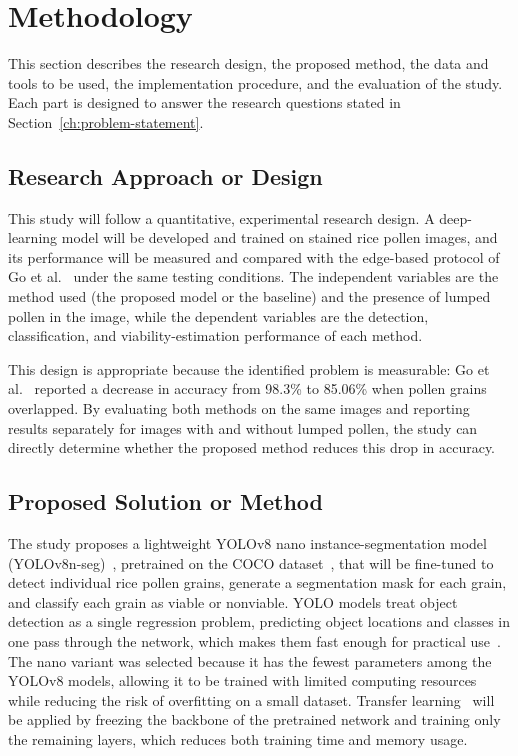 \newpage
\section{Methodology}
\label{ch:methodology}

This section describes the research design, the proposed method, the data and tools to be used, the implementation procedure, and the evaluation of the study. Each part is designed to answer the research questions stated in Section~\ref{ch:problem-statement}.

\subsection{Research Approach or Design}
\label{sec:m-design}

This study will follow a quantitative, experimental research design. A deep-learning model will be developed and trained on stained rice pollen images, and its performance will be measured and compared with the edge-based protocol of Go et al.~\cite{go2019} under the same testing conditions. The independent variables are the method used (the proposed model or the baseline) and the presence of lumped pollen in the image, while the dependent variables are the detection, classification, and viability-estimation performance of each method.

This design is appropriate because the identified problem is measurable: Go et al.~\cite{go2019} reported a decrease in accuracy from 98.3\% to 85.06\% when pollen grains overlapped. By evaluating both methods on the same images and reporting results separately for images with and without lumped pollen, the study can directly determine whether the proposed method reduces this drop in accuracy.

\subsection{Proposed Solution or Method}
\label{sec:m-proposed-method}

The study proposes a lightweight YOLOv8 nano instance-segmentation model (YOLOv8n-seg)~\cite{jocher2023yolov8}, pretrained on the COCO dataset~\cite{lin2014coco}, that will be fine-tuned to detect individual rice pollen grains, generate a segmentation mask for each grain, and classify each grain as viable or nonviable. YOLO models treat object detection as a single regression problem, predicting object locations and classes in one pass through the network, which makes them fast enough for practical use~\cite{redmon2016yolo}. The nano variant was selected because it has the fewest parameters among the YOLOv8 models, allowing it to be trained with limited computing resources while reducing the risk of overfitting on a small dataset. Transfer learning~\cite{pan2010transfer} will be applied by freezing the backbone of the pretrained network and training only the remaining layers, which reduces both training time and memory usage.

